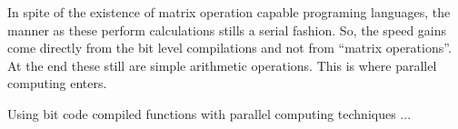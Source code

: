 \documentclass{article}[11pt,subeqn]
\begin{document}
\begin{spacing}{1.25}
In spite of the existence of matrix operation capable programing languages, the manner as these perform calculations stills a serial fashion. So, the speed gains come directly from the bit level compilations and not from ``matrix operations''. At the end these still are simple arithmetic operations. This is where parallel computing enters.

Using bit code compiled functions with parallel computing techniques ...

\nocite{vespignani2011modelling}
\newpage


\end{spacing}
\end{document}
